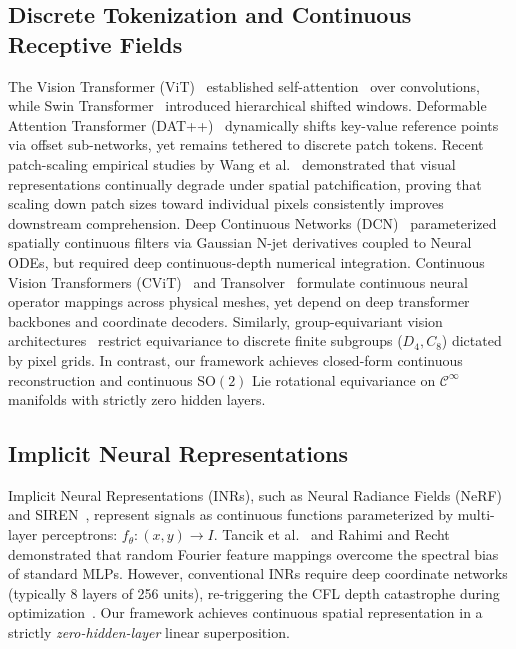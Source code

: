 \documentclass[10pt,twocolumn]{article}
\begin{document}
\subsection{Discrete Tokenization and Continuous Receptive Fields}
The Vision Transformer (ViT)~\cite{dosovitskiy2020image} established self-attention~\cite{vaswani2017attention} over convolutions, while Swin Transformer~\cite{liu2021swin} introduced hierarchical shifted windows. Deformable Attention Transformer (DAT++)~\cite{xia2024dat} dynamically shifts key-value reference points via offset sub-networks, yet remains tethered to discrete patch tokens. Recent patch-scaling empirical studies by Wang et al.~\cite{wang2025scaling} demonstrated that visual representations continually degrade under spatial patchification, proving that scaling down patch sizes toward individual pixels consistently improves downstream comprehension. Deep Continuous Networks (DCN)~\cite{tomen2021deep} parameterized spatially continuous filters via Gaussian N-jet derivatives coupled to Neural ODEs, but required deep continuous-depth numerical integration. Continuous Vision Transformers (CViT)~\cite{wang2024cvit} and Transolver~\cite{wu2024transolver} formulate continuous neural operator mappings across physical meshes, yet depend on deep transformer backbones and coordinate decoders. Similarly, group-equivariant vision architectures~\cite{xu2023equivariant} restrict equivariance to discrete finite subgroups ($D_4, C_8$) dictated by pixel grids. In contrast, our framework achieves closed-form continuous reconstruction and continuous $\mathrm{SO}(2)$ Lie rotational equivariance on $\mathcal{C}^\infty$ manifolds with strictly zero hidden layers.

\subsection{Implicit Neural Representations}
Implicit Neural Representations (INRs), such as Neural Radiance Fields (NeRF)~\cite{mildenhall2020nerf} and SIREN~\cite{sitzmann2020implicit}, represent signals as continuous functions parameterized by multi-layer perceptrons: $f_\theta: (x, y) \to I$. Tancik et al.~\cite{tancik2020fourier} and Rahimi and Recht~\cite{rahimi2007random} demonstrated that random Fourier feature mappings overcome the spectral bias of standard MLPs. However, conventional INRs require deep coordinate networks (typically 8 layers of 256 units), re-triggering the CFL depth catastrophe during optimization~\cite{barmase2026variational}. Our framework achieves continuous spatial representation in a strictly \textit{zero-hidden-layer} linear superposition.
\end{document}
